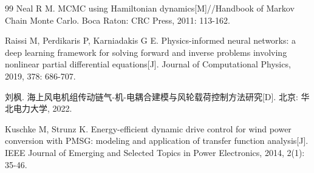 \documentclass[withoutpreface,bwprint]{cumcmthesis}
\begin{document}
\begin{thebibliography}{99}
Neal R M. MCMC using Hamiltonian dynamics[M]//Handbook of Markov Chain Monte Carlo. Boca Raton: CRC Press, 2011: 113-162.

Raissi M, Perdikaris P, Karniadakis G E. Physics-informed neural networks: a deep learning framework for solving forward and inverse problems involving nonlinear partial differential equations[J]. Journal of Computational Physics, 2019, 378: 686-707.

刘枫. 海上风电机组传动链气-机-电耦合建模与风轮载荷控制方法研究[D]. 北京: 华北电力大学, 2022.

Kuschke M, Strunz K. Energy-efficient dynamic drive control for wind power conversion with PMSG: modeling and application of transfer function analysis[J]. IEEE Journal of Emerging and Selected Topics in Power Electronics, 2014, 2(1): 35-46.

\end{thebibliography}
\end{document}
